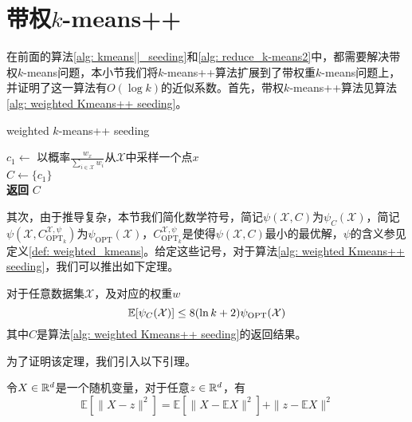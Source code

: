 \section{带权\texorpdfstring{$k$}{k}-means++}
在前面的算法\ref{alg: kmeans||_seeding}和\ref{alg: reduce_k-means2}中，都需要解决带权$k$-means问题，本小节我们将$k$-means++算法扩展到了带权重$k$-means问题上，并证明了这一算法有$O(\log k)$的近似系数。首先，带权$k$-means++算法见算法\ref{alg: weighted Kmeans++ seeding}。
\begin{algorithm}
    \caption{weighted $k$-means++ seeding}\label{alg: weighted Kmeans++ seeding}
    $c_1 \gets $ 以概率$\frac{w_x}{\sum_{i \in \mathcal{X}} w_i}$从$\mathcal{X}$中采样一个点$x$ \\
    $C \gets \{c_1\}$ \\
    \textbf{返回} $C$
\end{algorithm}
其次，由于推导复杂，本节我们简化数学符号，简记$\psi(\mathcal{X},C)$为$\psi_{C}(\mathcal{X})$，简记$\psi(\mathcal{X},C_{\text{OPT}_k}^{\mathcal{X},\psi})$为$\psi_{\text{OPT}}(\mathcal{X})$，$C_{\text{OPT}_k}^{\mathcal{X},\psi}$是使得$\psi(\mathcal{X},C)$最小的最优解，$\psi$的含义参见定义\ref{def: weighted_kmeans}。给定这些记号，对于算法\ref{alg: weighted Kmeans++ seeding}，我们可以推出如下定理。
\begin{theorem}
    \label{theo: weighted kmeans++}
    对于任意数据集$\mathcal{X}$，及对应的权重$w$
    \begin{equation*}
        \mathbb{E}[\psi_C(\mathcal{X})] \leq 8(\ln k + 2) \psi_\text{OPT}(\mathcal{X})
    \end{equation*}
    其中$C$是算法\ref{alg: weighted Kmeans++ seeding}的返回结果。
\end{theorem}
为了证明该定理，我们引入以下引理。
\begin{lemma}
    \label{lem: expectation}
    令$X\in \mathbb{R}^d$是一个随机变量，对于任意$z \in \mathbb{R}^d$，有
    \begin{equation}
        \label{eq: expectation1}
        \mathbb{E}[\|X-z\|^{2}]=\mathbb{E}[\|X-\mathbb{E} X\|^{2}]+\|z-\mathbb{E} X\|^{2}
    \end{equation}
\end{lemma}
